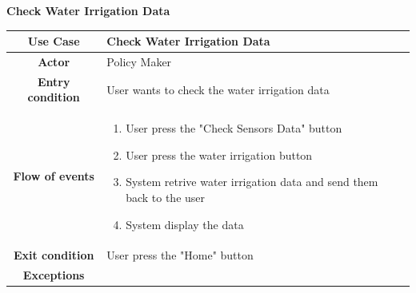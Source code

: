 \documentclass[table, 12pt]{article}
\begin{document}
\begin{itemize}
            
            \begin{table}[H]
                \item[] \textbf{Check Water Irrigation Data}
                \item[] 
                \centering
                \begin{tabular}{c m{}}
                    \hline
                    \textbf{Use Case} & Check Water Irrigation Data\\ \hline
                    \textbf{Actor} & Policy Maker \\ \hline
                    \textbf{Entry condition} & User wants to check the water irrigation data\\  \hline
                    \textbf{Flow of events} & \begin{enumerate}
                                                \item User press the "Check Sensors Data" button
                                                \item User press the water irrigation button
                                                \item System retrive water irrigation data and send them back to the user 
                                                \item System display the data
                                            \end{enumerate}\\ \hline
                    \textbf{Exit condition} & User press the "Home" button\\ \hline
                    \textbf{Exceptions} &  \\ \hline                   
                \end{tabular}
            \end{table}


\end{itemize}
\end{document}
